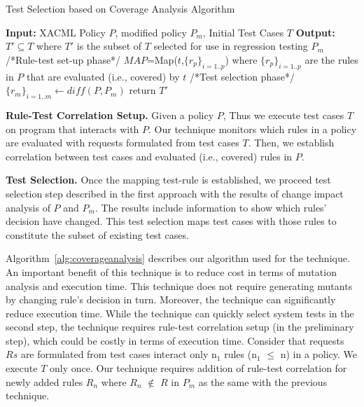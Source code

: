 \begin{algorithmic}
\begin{algorithm}[t]
\caption{\label{alg:coverageanalysis}Test Selection based on Coverage Analysis Algorithm}
\STATE \textbf{Input:} XACML Policy $P$, modified policy $P_{m}$, Initial Test Cases $T$
\STATE \textbf{Output:} $T' \subseteq T$ where $T'$ is the subset of $T$ selected for use in regression testing $P_{m}$
\STATE /*Rule-test set-up phase*/
\STATE $MAP$=Map($t$,$\{r_{p}\}_{i=1..p}$) where $\{r_{p}\}_{i=1..p}$ are the rules in $P$ that are evaluated (i.e., covered) by $t$
\ENDFOR
\STATE /*Test selection phase*/
\STATE $\{r_{m}\}_{i=1..m} \leftarrow diff(P,P_{m})$
\ENDFOR
\STATE return $T'$
\end{algorithm}
\end{algorithmic}

\textbf{Rule-Test Correlation Setup.} Given a policy $P$,
Thus we execute test cases $T$ on program that interacts with $P$. Our technique monitors which rules in a policy are evaluated with
requests formulated from test cases $T$. Then, we establish correlation between test cases and evaluated (i.e., covered) rules in $P$. 

\textbf{Test Selection.}
Once the mapping test-rule is established, we proceed test selection step described in the first approach with
the results of change impact analysis of $P$ and $P_m$. The results include information to show which rules' decision have changed.
This test selection maps test cases with those rules to constitute the subset of existing test cases.

Algorithm~\ref{alg:coverageanalysis} describes our algorithm used for the technique.
An important benefit of this technique is to reduce cost in terms of mutation analysis and execution time. This technique does not 
require generating mutants by changing rule's decision in turn. Moreover, the technique can significantly reduce execution time.
While the technique can quickly select system tests in the second step, the technique requires rule-test correlation setup (in the preliminary step), 
which could be costly in terms of execution time. Consider that requests $Rs$ are formulated from test cases interact 
only n$_1$ rules (n$_1$ $\leq$ n) in a policy.
We execute $T$ only once. Our technique requires addition of rule-test
correlation for newly added rules $R_n$ where $R_n$ $\notin$ $R$ in $P_m$ as the same with the previous technique.


